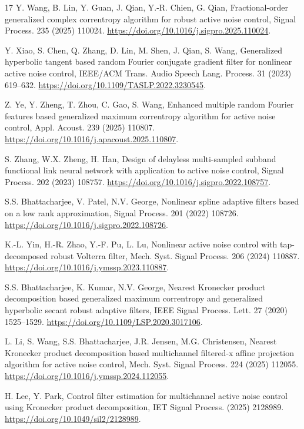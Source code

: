 \documentclass[preprint,12pt]{elsarticle}
\begin{document}
\begin{thebibliography}{17}
Y. Wang, B. Lin, Y. Guan, J. Qian, Y.-R. Chien, G. Qian, Fractional-order generalized complex correntropy algorithm for robust active noise control, Signal Process. 235 (2025) 110024. \url{https://doi.org/10.1016/j.sigpro.2025.110024}.

Y. Xiao, S. Chen, Q. Zhang, D. Lin, M. Shen, J. Qian, S. Wang, Generalized hyperbolic tangent based random Fourier conjugate gradient filter for nonlinear active noise control, IEEE/ACM Trans. Audio Speech Lang. Process. 31 (2023) 619--632. \url{https://doi.org/10.1109/TASLP.2022.3230545}.

Z. Ye, Y. Zheng, T. Zhou, C. Gao, S. Wang, Enhanced multiple random Fourier features based generalized maximum correntropy algorithm for active noise control, Appl. Acoust. 239 (2025) 110807. \url{https://doi.org/10.1016/j.apacoust.2025.110807}.

S. Zhang, W.X. Zheng, H. Han, Design of delayless multi-sampled subband functional link neural network with application to active noise control, Signal Process. 202 (2023) 108757. \url{https://doi.org/10.1016/j.sigpro.2022.108757}.

S.S. Bhattacharjee, V. Patel, N.V. George, Nonlinear spline adaptive filters based on a low rank approximation, Signal Process. 201 (2022) 108726. \url{https://doi.org/10.1016/j.sigpro.2022.108726}.

K.-L. Yin, H.-R. Zhao, Y.-F. Pu, L. Lu, Nonlinear active noise control with tap-decomposed robust Volterra filter, Mech. Syst. Signal Process. 206 (2024) 110887. \url{https://doi.org/10.1016/j.ymssp.2023.110887}.

S.S. Bhattacharjee, K. Kumar, N.V. George, Nearest Kronecker product decomposition based generalized maximum correntropy and generalized hyperbolic secant robust adaptive filters, IEEE Signal Process. Lett. 27 (2020) 1525--1529. \url{https://doi.org/10.1109/LSP.2020.3017106}.

L. Li, S. Wang, S.S. Bhattacharjee, J.R. Jensen, M.G. Christensen, Nearest Kronecker product decomposition based multichannel filtered-x affine projection algorithm for active noise control, Mech. Syst. Signal Process. 224 (2025) 112055. \url{https://doi.org/10.1016/j.ymssp.2024.112055}.

H. Lee, Y. Park, Control filter estimation for multichannel active noise control using Kronecker product decomposition, IET Signal Process. (2025) 2128989. \url{https://doi.org/10.1049/sil2/2128989}.

\end{thebibliography}
\end{document}
